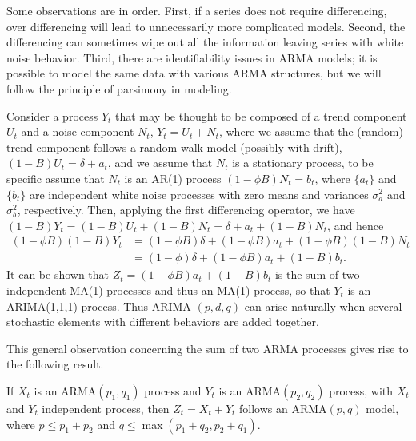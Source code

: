 Some observations are in order. First, if a series does not require differencing, over differencing will lead to unnecessarily more complicated models. Second, the differencing can sometimes wipe out all the information leaving series with white noise behavior. Third, there are identifiability issues in ARMA models; it is possible to model the same data with various ARMA structures, but we will follow the principle of parsimony in modeling. 


\begin{ex}
Consider a process $Y_t$ that may be thought to be composed of a trend component $U_t$ and a noise component $N_t$, $Y_t = U_t + N_t$, where we assume that the (random) trend component follows a random walk model (possibly with drift), $(1 - B)U_t = \delta + a_t$, and we assume that $N_t$ is a stationary process, to be specific assume that $N_t$ is an AR(1) process $(1 - \phi B)N_t = b_t$, where $\{a_t\}$ and $\{b_t\}$ are independent white noise processes with zero means and variances $\sigma_a^2$ and $\sigma_b^2$, respectively. Then, applying the first differencing operator, we have $(1 - B)Y_t = (1 - B)U_t + (1 - B)N_t = \delta + a_t + (1 - B)N_t$, and hence
	\begin{equation}\label{eqn:bphi}
	\begin{split}
	(1 - \phi B)(1 - B)Y_t&= (1 - \phi B)\delta + (1 - \phi B)a_t + (1 - \phi B)(1 - B)N_t \\
	&= (1 - \phi)\delta + (1 - \phi B)a_t + (1 - B)b_t.
	\end{split}
	\end{equation}
It can be shown that $Z_t = (1 - \phi B)a_t + (1 - B)b_t$ is the sum of two independent MA(1) processes and thus an MA(1) process, so that $Y_t$ is an ARIMA(1,1,1) process. Thus ARIMA $(p, d, q)$ can arise naturally when several stochastic elements with different behaviors are added together.
\end{ex}

This general observation concerning the sum of two ARMA processes gives rise to the following result. 

\begin{thm}[Aggregation]\label{thm:agg}
If $X_t$ is an ARMA$(p_1,q_1)$ process and $Y_t$ is an ARMA$(p_2,q_2)$ process, with $X_t$ and $Y_t$ independent process, then $Z_t = X_t + Y_t$ follows an ARMA$(p,q)$ model, where $p \leq p_1 + p_2$ and $q \leq \max(p_1 + q_2, p_2 + q_1)$.
\end{thm}


